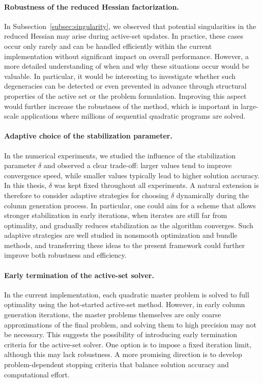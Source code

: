 \documentclass{book}
\theoremstyle{definition}
\newcounter{algorithm_}
\numberwithin{algorithm_}{chapter}
\begin{document}
{\paragraph{Robustness of the reduced Hessian factorization.}
In Subsection~\ref{subsec:singularity}, we observed that potential singularities in the reduced Hessian may arise during active-set updates. In practice, these cases occur only rarely and can be handled efficiently within the current implementation without significant impact on overall performance. However, a more detailed understanding of when and why these situations occur would be valuable. In particular, it would be interesting to investigate whether such degeneracies can be detected or even prevented in advance through structural properties of the active set or the problem formulation. Improving this aspect would further increase the robustness of the method, which is important in large-scale applications where millions of sequential quadratic programs are solved.

\paragraph{Adaptive choice of the stabilization parameter.}
In the numerical experiments, we studied the influence of the stabilization parameter $\delta$ and observed a clear trade-off: larger values tend to improve convergence speed, while smaller values typically lead to higher solution accuracy. In this thesis, $\delta$ was kept fixed throughout all experiments. A natural extension is therefore to consider adaptive strategies for choosing $\delta$ dynamically during the column generation process. In particular, one could aim for a scheme that allows stronger stabilization in early iterations, when iterates are still far from optimality, and gradually reduces stabilization as the algorithm converges. Such adaptive strategies are well studied in nonsmooth optimization and bundle methods, and transferring these ideas to the present framework could further improve both robustness and efficiency.

\paragraph{Early termination of the active-set solver.}
In the current implementation, each quadratic master problem is solved to full optimality using the hot-started active-set method. However, in early column generation iterations, the master problems themselves are only coarse approximations of the final problem, and solving them to high precision may not be necessary. This suggests the possibility of introducing early termination criteria for the active-set solver. One option is to impose a fixed iteration limit, although this may lack robustness. A more promising direction is to develop problem-dependent stopping criteria that balance solution accuracy and computational effort.

}
\end{document}
